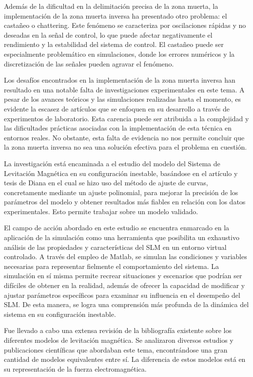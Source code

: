 Además de la dificultad en la delimitación precisa de la zona muerta, la implementación de la zona muerta inversa ha presentado otro problema: el castañeo o chattering. Este fenómeno se caracteriza por oscilaciones rápidas y no deseadas en la señal de control, lo que puede afectar negativamente el rendimiento y la estabilidad del sistema de control. El castañeo puede ser especialmente problemático en simulaciones, donde los errores numéricos y la discretización de las señales pueden agravar el fenómeno.

Los desafíos encontrados en la implementación de la zona muerta inversa han resultado en una notable falta de investigaciones experimentales en este tema. A pesar de los avances teóricos y las simulaciones realizadas hasta el momento, es evidente la escasez de artículos que se enfoquen en su desarrollo a través de experimentos de laboratorio. Esta carencia puede ser atribuida a la complejidad y las dificultades prácticas asociadas con la implementación de esta técnica en entornos reales. No obstante, esta falta de evidencia no nos permite concluir que la zona muerta inversa no sea una solución efectiva para el problema en cuestión.

La investigación está encaminada a el estudio del modelo del Sistema de Levitación Magnética en su configuración inestable, basándose en el artículo y tesis de Diana en el cual se hizo uso del método de ajuste de curvas, concretamente mediante un ajuste polinomial, para mejorar la precisión de los parámetros del modelo y obtener resultados más fiables en relación con los datos experimentales. Esto permite trabajar sobre un modelo validado.

El campo de acción abordado en este estudio se encuentra enmarcado en la aplicación de la simulación como una herramienta que posibilita un exhaustivo análisis de las propiedades y características del SLM en un entorno virtual controlado. A través del empleo de Matlab, se simulan las condiciones y variables necesarias para representar fielmente el comportamiento del sistema.
La simulación en sí misma permite recrear situaciones y escenarios que podrían ser difíciles de obtener en la realidad, además de ofrecer la capacidad de modificar y ajustar parámetros específicos para examinar su influencia en el desempeño del SLM. De esta manera, se logra una comprensión más profunda de la dinámica del sistema en su configuración inestable.


Fue llevado a cabo una extensa revisión de la bibliografía existente sobre los diferentes modelos de levitación magnética. Se analizaron diversos estudios y publicaciones científicas que abordaban este tema, encontrándose una gran cantidad de modelos equivalentes entre sí. La diferencia de estos modelos está en su representación de la fuerza electromagnética.

